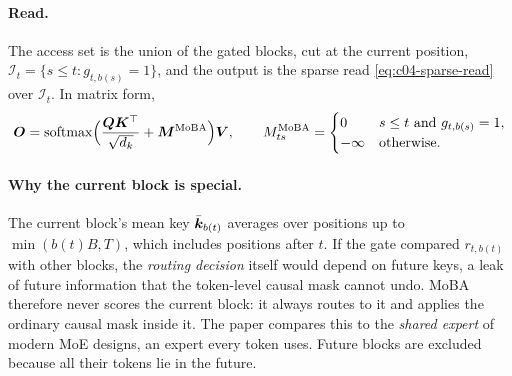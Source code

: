 \paragraph{Read.}
The access set is the union of the gated blocks, cut at the current position,
$\mathcal{I}_t=\{s\le t: g_{t,b(s)}=1\}$, and the output is the sparse read
\eqref{eq:c04-sparse-read} over $\mathcal{I}_t$. In matrix form,
\begin{equation}\label{eq:c04-moba-matrix}
  \bm{O} = \operatorname{softmax}\!\Big(\frac{\bm{Q}\bm{K}^{\top}}{\sqrt{d_k}} + \bm{M}^{\mathrm{MoBA}}\Big)\bm{V},\qquad
  M^{\mathrm{MoBA}}_{ts} = \begin{cases}0 & s\le t \text{ and } g_{t,b(s)}=1,\\ -\infty & \text{otherwise.}\end{cases}
\end{equation}

\paragraph{Why the current block is special.}
The current block's mean key $\bar{\bm{k}}_{b(t)}$ averages over positions up to $\min(b(t)B,T)$,
which includes positions after $t$. If the gate compared $r_{t,b(t)}$ with other blocks, the
\emph{routing decision} itself would depend on future keys, a leak of future information that
the token-level causal mask cannot undo. MoBA therefore never scores the current block: it
always routes to it and applies the ordinary causal mask inside it. The paper compares this to
the \emph{shared expert} of modern MoE designs, an expert every token uses. Future blocks are
excluded because all their tokens lie in the future.

